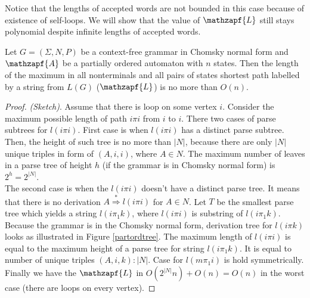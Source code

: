 Notice that the lengths of accepted words are not bounded in this case because of existence of self-loops. We will show that the value of $\mathzapf{L}$ still stays polynomial despite infinite lengths of accepted words.
\begin{lemma}
\label{partord}
Let  $G = (\Sigma, N, P)$ be a context-free grammar in Chomsky normal form and $\mathzapf{A}$ be a partially ordered automaton with $n$ states. Then the length of the maximum in all nonterminals and all pairs of states shortest path labelled by a string from $L(G)$ ($\mathzapf{L}$) is no more than $O(n)$.
\end{lemma}
\begin{proof} \textit{(Sketch)}.
Assume that there is loop on some vertex $i$. Consider the maximum possible length of path $i\pi i$ from $i$ to $i$. There two cases of parse subtrees for $l(i\pi i)$. First case is when $l(i\pi i)$ has a distinct parse subtree. Then, the height of such tree is no more than $|N|$, because there are only $|N|$ unique triples in form of $(A, i, i)$, where $A \in N$. The maximum number of leaves in a parse tree of height $h$ (if the grammar is in Chomsky normal form) is $2^h=2^{|N|}$.
\\The second case is when the $l(i\pi i)$ doesn't have a distinct parse tree. It means that there is no derivation $A \stackrel {*}{\Rightarrow } l(i\pi i)$ for $A \in N$. Let $T$ be the smallest parse tree which yields a string $l(i \pi_1 k)$, where $l(i\pi i)$ is substring of $l(i \pi_1 k)$. Because the grammar is in the Chomsky normal form, derivation tree for $l(i \pi k)$ looks as illustrated in Figure \ref{partordtree}. The maximum length of $l(i\pi i)$ is equal to the maximum height of a parse tree for string $l(i \pi_1 k)$. It is equal to number of unique triples $(A, i, k):|N|$. Case for $l(m \pi_1 i)$ is hold symmetrically. Finally we have the $\mathzapf{L}$ in $O(2^{|N|}n) + O(n) = O(n)$ in the worst case (there are loops on every vertex).
\end{proof}


